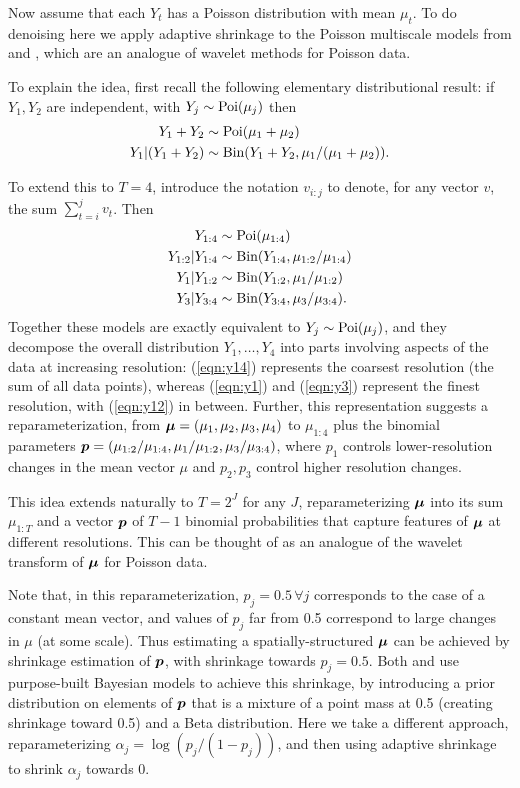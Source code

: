\documentclass[12pt]{article}
\begin{document}
Now assume that each $Y_t$ has a Poisson distribution with mean $\mu_t$.
To do denoising here we apply adaptive shrinkage to the Poisson multiscale models
from \cite{Nowak2000Statistical} and \cite{Timmermann1999Multiscale}, which are an analogue of
wavelet methods for Poisson data.

To explain the idea, first recall the following elementary distributional result:
if $Y_1,Y_2$ are independent, with $Y_j \sim \text{Poi}(\mu_j)$ then 
\begin{align}
Y_1 + Y_2 & \sim \text{Poi}(\mu_1 + \mu_2) \\
Y_1 | (Y_1+Y_2) & \sim \text{Bin}(Y_1+Y_2, \mu_1/(\mu_1+\mu_2)).
\end{align} 

To extend this to $T=4$, introduce the notation $v_{i:j}$ to denote, for any vector $v$, 
the sum $\sum_{t=i}^j v_t$.  Then 
\begin{align} 
Y_{1:4} & \sim \text{Poi}(\mu_{1:4}) \label{eqn:y14} \\
Y_{1:2} | Y_{1:4} & \sim \text{Bin}(Y_{1:4}, \mu_{1:2}/\mu_{1:4})  \label{eqn:y12} \\
Y_1 | Y_{1:2} & \sim \text{Bin}(Y_{1:2}, \mu_1/\mu_{1:2}) \label{eqn:y1} \\ 
Y_3 | Y_{3:4} & \sim \text{Bin}(Y_{3:4}, \mu_3/\mu_{3:4}). \label{eqn:y3}
\end{align} 
Together these models are exactly equivalent to $Y_j \sim \text{Poi}(\mu_j)$, and
they decompose the overall distribution $Y_1,\dots,Y_4$ into parts involving aspects of the data at 
increasing resolution: (\ref{eqn:y14}) represents the coarsest resolution (the sum of all data points), 
whereas (\ref{eqn:y1}) and (\ref{eqn:y3}) represent the finest resolution, with (\ref{eqn:y12}) in between. 
Further, this representation suggests a reparameterization, from $\bm{\mu}=(\mu_1,\mu_2,\mu_3,\mu_4)$
to $\mu_{1:4}$ plus the binomial parameters $\bm{p}=(\mu_{1:2}/\mu_{1:4}, \mu_1/\mu_{1:2}, \mu_3/\mu_{3:4})$, where 
$p_1$ controls lower-resolution changes in the mean vector $\mu$ and $p_2,p_3$ control higher resolution changes.

This idea extends naturally to $T=2^J$ for any $J$, reparameterizing $\bm{\mu}$ into its sum $\mu_{1:T}$
and a vector $\bm{p}$ of $T-1$ binomial probabilities that capture features of $\bm{\mu}$ at different resolutions.
This can be thought of as an analogue of the wavelet transform of $\bm{\mu}$ for Poisson data.

Note that, in this reparameterization, $p_j=0.5 \, \forall j$ corresponds to the case of a constant mean vector,
and values of $p_j$ far from 0.5 correspond to large changes in $\mu$ (at some scale).
Thus estimating a spatially-structured $\bm{\mu}$ can be achieved by shrinkage estimation of $\bm{p}$, with shrinkage towards $p_j=0.5$. Both \cite{kolaczyk1999wavelet} and \cite{Timmermann1999Multiscale} use purpose-built Bayesian models to
achieve this shrinkage, by introducing a prior distribution on elements of $\bm{p}$ that is
a mixture of a point mass at 0.5 (creating shrinkage toward 0.5) 
and a Beta distribution. Here we take a different approach, reparameterizing $\alpha_j = \log(p_j/(1-p_j))$,
and then using adaptive shrinkage to shrink $\alpha_j$ towards 0. 
\end{document}
